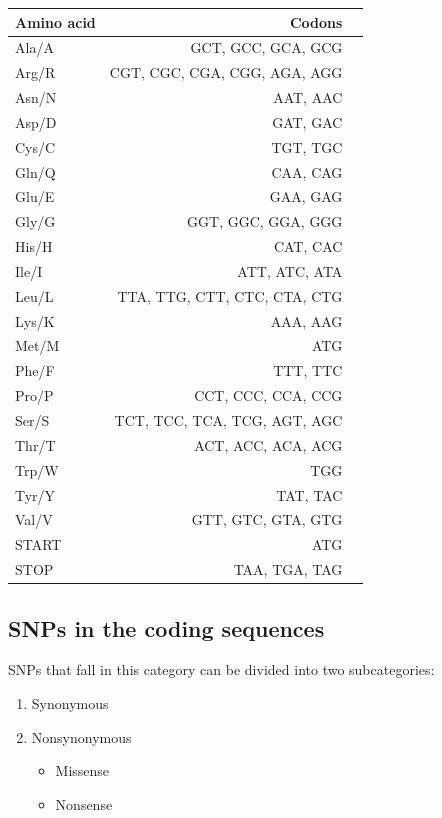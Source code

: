\begin{tabular}{|l|rl|}
\hline
Amino acid          &		 Codons        &       \\
\hline
Ala/A 		&	GCT, GCC, GCA, GCG       &      	\\
Arg/R 		&	CGT, CGC, CGA, CGG, AGA, AGG       &      		\\
Asn/N	 	&	AAT, AAC       &      	\\
Asp/D		&	GAT, GAC       &      	\\
Cys/C		&	TGT, TGC       &      	\\
Gln/Q		&	CAA, CAG       &      	\\
Glu/E		&	GAA, GAG       &      	\\
Gly/G		&	GGT, GGC, GGA, GGG       &      	\\
His/H		&	CAT, CAC       &      	\\
Ile/I		&	ATT, ATC, ATA       &      	\\
Leu/L		&	TTA, TTG, CTT, CTC, CTA, CTG       &      	\\
Lys/K		&	AAA, AAG       &      	\\
Met/M		&	ATG       &      	\\
Phe/F		&	TTT, TTC       &      	\\
Pro/P		&	CCT, CCC, CCA, CCG       &      	\\
Ser/S		&	TCT, TCC, TCA, TCG, AGT, AGC       &      	\\
Thr/T		&	ACT, ACC, ACA, ACG       &      	\\
Trp/W		&	TGG       &      	\\
Tyr/Y		&	TAT, TAC       &      	\\
Val/V		&	GTT, GTC, GTA, GTG       &      	\\
START		&	ATG       &      	\\
STOP		&	TAA, TGA, TAG       &      	\\
\hline
\end{tabular}

\vspace{15mm}

\subsection{SNPs in the coding sequences}
SNPs that fall in this category can be divided into two subcategories:

\newpage

\begin{enumerate}
	\item Synonymous
	\item Nonsynonymous
	\begin{itemize}
	\item Missense
	\item Nonsense
	\end{itemize}
	\end{enumerate}

